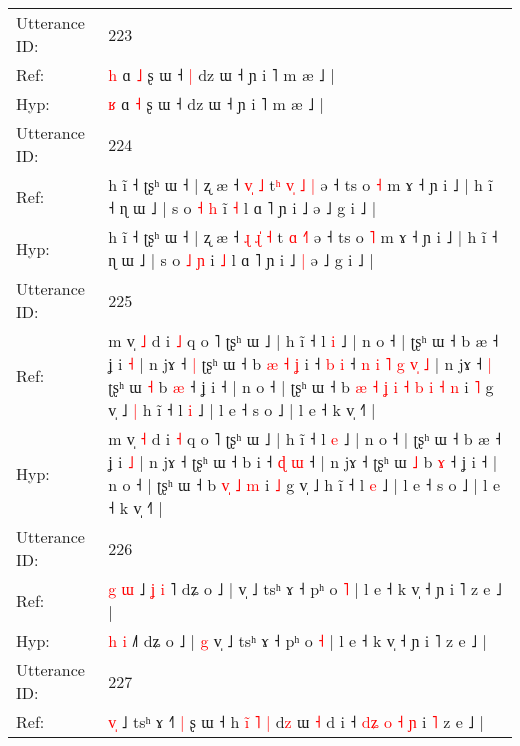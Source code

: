 \documentclass[10pt]{article}
\DeclareRobustCommand{\hl}[1]{{\textcolor{red}{#1}}}
\begin{document}
\begin{longtable}{ll}
 \\
\midrule
Utterance ID: & 223 \\
Ref: & \hl{h} ɑ \hl{˩} ʂ ɯ ˧\hl{ }\hl{|} dz ɯ ˧ ɲ i ˥ m æ ˩ |
 \\
Hyp: & \hl{ʁ} ɑ \hl{˧} ʂ ɯ ˧\hl{}\hl{} dz ɯ ˧ ɲ i ˥ m æ ˩ |
 \\
\midrule
Utterance ID: & 224 \\
Ref: & h ĩ ˧ ʈʂʰ ɯ ˧ | ʐ æ ˧\hl{}\hl{} \hl{v}\hl{̩} \hl{˩} t\hl{ʰ} \hl{v}\hl{̩} \hl{˩}\hl{ }\hl{|} ə ˧ ts o \hl{˧} m ɤ ˧ ɲ i ˩ | h ĩ ˧ ɳ ɯ ˩ | s o \hl{˧} \hl{h} i\hl{̃} \hl{˧} l ɑ ˥ ɲ i ˩\hl{}\hl{} ə ˩ g i ˩ |
 \\
Hyp: & h ĩ ˧ ʈʂʰ ɯ ˧ | ʐ æ ˧\hl{ }\hl{ɻ} \hl{ɻ}\hl{̍} \hl{˧} t\hl{} \hl{}\hl{ɑ} \hl{}\hl{˧}\hl{˥} ə ˧ ts o \hl{˥} m ɤ ˧ ɲ i ˩ | h ĩ ˧ ɳ ɯ ˩ | s o \hl{˩} \hl{ɲ} i\hl{} \hl{˩} l ɑ ˥ ɲ i ˩\hl{ }\hl{|} ə ˩ g i ˩ |
 \\
\midrule
Utterance ID: & 225 \\
Ref: & m v̩ \hl{˩} d i \hl{˩} q o ˥ ʈʂʰ ɯ ˩ | h ĩ ˧ l \hl{i} ˩ | n o ˧ | ʈʂʰ ɯ ˧ b æ ˧ ʝ i \hl{˧} | n jɤ ˧\hl{ }\hl{|} ʈʂʰ ɯ ˧ b\hl{ }\hl{æ}\hl{ }\hl{˧}\hl{ }\hl{ʝ} i ˧ \hl{b} \hl{i} ˧\hl{ }\hl{n}\hl{ }\hl{i}\hl{ }\hl{˥}\hl{ }\hl{g}\hl{ }\hl{v}\hl{̩}\hl{ }\hl{˩} | n jɤ ˧\hl{ }\hl{|} ʈʂʰ ɯ \hl{˧} b \hl{æ} ˧ ʝ i ˧ | n o ˧ | ʈʂʰ ɯ ˧ b\hl{ }\hl{æ}\hl{ }\hl{˧}\hl{ }\hl{ʝ}\hl{ }\hl{i}\hl{ }\hl{˧} \hl{b}\hl{ }\hl{i} \hl{˧} \hl{n} i \hl{˥} g v̩ ˩\hl{ }\hl{|} h ĩ ˧ l \hl{i} ˩ | l e ˧ s o ˩ | l e ˧ k v̩ ˧˥ |
 \\
Hyp: & m v̩ \hl{˧} d i \hl{˧} q o ˥ ʈʂʰ ɯ ˩ | h ĩ ˧ l \hl{e} ˩ | n o ˧ | ʈʂʰ ɯ ˧ b æ ˧ ʝ i \hl{˩} | n jɤ ˧\hl{}\hl{} ʈʂʰ ɯ ˧ b\hl{}\hl{}\hl{}\hl{}\hl{}\hl{} i ˧ \hl{ɖ} \hl{ɯ} ˧\hl{}\hl{}\hl{}\hl{}\hl{}\hl{}\hl{}\hl{}\hl{}\hl{}\hl{}\hl{}\hl{} | n jɤ ˧\hl{}\hl{} ʈʂʰ ɯ \hl{˩} b \hl{ɤ} ˧ ʝ i ˧ | n o ˧ | ʈʂʰ ɯ ˧ b\hl{}\hl{}\hl{}\hl{}\hl{}\hl{}\hl{}\hl{}\hl{}\hl{} \hl{}\hl{v}\hl{̩} \hl{˩} \hl{m} i \hl{˩} g v̩ ˩\hl{}\hl{} h ĩ ˧ l \hl{e} ˩ | l e ˧ s o ˩ | l e ˧ k v̩ ˧˥ |
 \\
\midrule
Utterance ID: & 226 \\
Ref: & \hl{g} \hl{ɯ} ˩\hl{ }\hl{ʝ}\hl{ }\hl{i}\hl{ }˥ dʑ o ˩ |\hl{}\hl{} v̩ ˩ tsʰ ɤ ˧ pʰ o \hl{˥} | l e ˧ k v̩ ˧ ɲ i ˥ z e ˩ |
 \\
Hyp: & \hl{h} \hl{i} ˩\hl{}\hl{}\hl{}\hl{}\hl{}˥ dʑ o ˩ |\hl{ }\hl{g} v̩ ˩ tsʰ ɤ ˧ pʰ o \hl{˧} | l e ˧ k v̩ ˧ ɲ i ˥ z e ˩ |
 \\
\midrule
Utterance ID: & 227 \\
Ref: & \hl{v}\hl{̩} ˩ tsʰ ɤ ˧˥\hl{ }\hl{|} ʂ ɯ ˧ h\hl{ }\hl{i}\hl{̃}\hl{ }\hl{˥}\hl{ }\hl{|} d\hl{z} ɯ \hl{˧} d i ˧ \hl{d}\hl{ʑ} \hl{o} \hl{˧} \hl{ɲ} i \hl{˥} z e ˩ |

\end{longtable}
\end{document}
